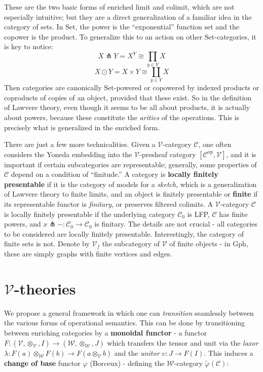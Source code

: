 \documentclass[a4paper,UKenglish]{article}
\newcommand{\Gph}{\mathrm{Gph}}
\newcommand{\Set}{\mathrm{Set}}
\newcommand{\op}{\mathrm{op}}
\newcommand{\V}{\mathscr{V}}
\newcommand{\W}{\mathscr{W}}
\newcommand{\C}{\mathscr{C}}
\newcommand{\pfk}{\pitchfork}
\begin{document}
These are the two basic forms of enriched limit and colimit, which are not especially intuitive; but they are a direct generalization of a familiar idea in the category of sets. In $\Set$, the power is the ``exponential'' function set and the copower is the product. To generalize this to an action on other $\Set$-categories, it is key to notice: $$X \pfk Y = X^Y \cong \prod_{y\in Y}X$$ $$X \odot Y = X \times Y \cong \coprod_{y\in Y}X$$ Then categories are canonically $\Set$-powered or copowered by indexed products or coproducts of copies of an object, provided that these exist. So in the definition of Lawvere theory, even though it seems to be all about products, it is actually about powers, because these constitute the \textit{arities} of the operations. This is precisely what is generalized in the enriched form.

There are just a few more technicalities. Given a $\V$-category $\C$, one often considers the Yoneda embedding into the $\V$-presheaf category $[\C^\op, \V]$, and it is important if certain subcategories are representable; generally, some properties of $\C$ depend on a condition of ``finitude.'' \cite{finite} A category is \textbf{locally finitely presentable} if it is the category of models for a \textit{sketch}, which is a generalization of Lawvere theory to finite limits, and an object is finitely presentable or \textbf{finite} if its representable functor is \textit{finitary}, or preserves filtered colimits. A $\V$-category $\C$ is locally finitely presentable if the underlying category $\C_0$ is LFP, $\C$ has finite powers, and $x\pfk -: \C_0 \to \C_0$ is finitary. The details are not crucial - all categories to be considered are locally finitely presentable. Interestingly, the category of finite sets is not. Denote by $\V_f$ the subcategory of $\V$ of finite objects - in $\Gph$, these are simply graphs with finite vertices and edges.\\

\section{$\V$-theories}


We propose a general framework in which one can \textit{transition} seamlessly between the various forms of operational semantics. This can be done by transitioning between enriching categories by a \textbf{monoidal functor} - a functor $F: (\V,\otimes_\V,I) \to (\W,\otimes_\W,J)$ which transfers the tensor and unit via the \textit{laxor} $\lambda: F(a) \otimes_\W F(b) \to F(a\otimes_\V b)$ and the \textit{unitor} $\upsilon: J \to F(I)$. This induces a \textbf{change of base} functor $\varphi$ (Borceux) - defining the $\W$-category $\widetilde{\varphi}(\C)$:
\end{document}
